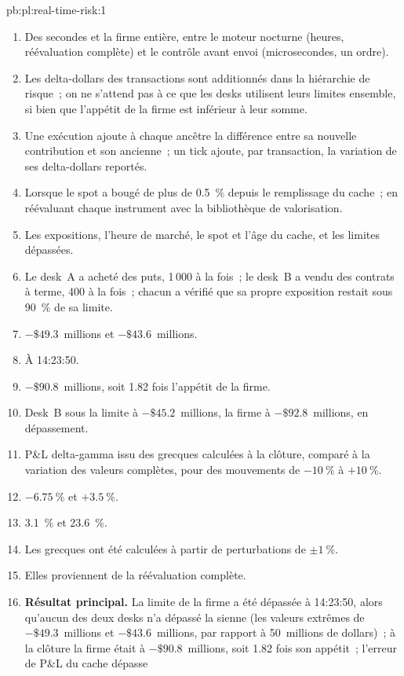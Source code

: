 \begin{solution}{pb:pl:real-time-risk:1}
\begin{enumerate}
\item Des secondes et la firme entière, entre le moteur nocturne (heures, réévaluation complète) et le contrôle avant envoi (microsecondes, un ordre).
\item Les delta-dollars des transactions sont additionnés dans la hiérarchie de risque~; on ne s'attend pas à ce que les desks utilisent leurs limites ensemble, si bien que l'appétit de la firme est inférieur
à leur somme.
\item Une exécution ajoute à chaque ancêtre la différence entre sa nouvelle contribution et son ancienne~; un tick ajoute, par transaction, la variation de ses delta-dollars reportés.
\item Lorsque le spot a bougé de plus de 0.5~\% depuis le remplissage du cache~; en réévaluant chaque instrument avec la bibliothèque de valorisation.
\item Les expositions, l'heure de marché, le spot et l'âge du cache, et les limites dépassées.
\item Le desk~A a acheté des puts, 1\,000 à la fois~; le desk~B a vendu des contrats à terme, 400 à la fois~; chacun a vérifié que sa propre exposition restait sous 90~\% de sa limite.
\item $-\$49.3$~millions et $-\$43.6$~millions.
\item À 14:23:50.
\item $-\$90.8$~millions, soit 1.82 fois l'appétit de la firme.
\item Desk~B sous la limite à $-\$45.2$~millions, la firme à $-\$92.8$~millions, en dépassement.
\item P\&L delta-gamma issu des grecques calculées à la clôture, comparé à la variation des valeurs complètes, pour des mouvements de $-10~\%$ à $+10~\%$.
\item $-6.75~\%$ et $+3.5~\%$.
\item 3.1~\% et 23.6~\%.
\item Les grecques ont été calculées à partir de perturbations de $\pm1~\%$.
\item Elles proviennent de la réévaluation complète.
\item \textbf{Résultat principal.} La limite de la firme a été dépassée à 14:23:50, alors qu'aucun des deux desks n'a dépassé la sienne (les valeurs extrêmes de $-\$49.3$~millions et
$-\$43.6$~millions, par rapport à 50~millions de dollars)~; à la clôture la firme était à $-\$90.8$~millions, soit 1.82 fois son appétit~; l'erreur de P\&L du cache dépasse

\end{enumerate}
\end{solution}
